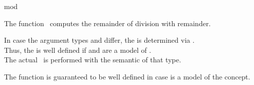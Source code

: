 \begin{ccRefFunction}{mod}

\ccDefinition

The function \ccRefName\ computes the remainder of division with remainder.

In case the argument types  and  differ, 
the  is determined via .\\
Thus, the  is well defined if  and  
are a model of . \\
The actual \ccRefName\ is performed with the semantic of that type.

The function is guaranteed to be well defined in case 
is a model of the  concept. 



\ccSeeAlso

\\
\\
\\
\\

\end{ccRefFunction}